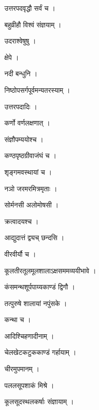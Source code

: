 \documentclass[10pt, openany, oneside]{book}
\begin{document}
\noindent उत्तरपदवृद्धौ सर्वं च ।

\noindent बहुव्रीहौ विश्वं संज्ञयाम् ।

\noindent उदराश्वेषुषु ।

\noindent क्षेपे ।

\noindent नदी बन्धुनि ।

\noindent निष्ठोपसर्गपूर्वमन्यतरस्याम् ।

\noindent उत्तरपदादिः ।

\noindent कर्णो वर्णलक्षणात् ।

\noindent संज्ञौपम्ययोश्च ।

\noindent कण्ठपृष्ठग्रीवाजंघं च ।

\noindent श‍ृङ्गमवस्थायां च ।

\noindent नञो जरमरमित्रमृताः ।

\noindent सोर्मनसी अलोमोषसी ।

\noindent क्रत्वादयश्च ।

\noindent आद्युदात्तं द्व्यच् छन्दसि ।

\noindent वीरवीर्यौ च ।

\noindent कूलतीरतूलमूलशालाऽक्षसममव्ययीभावे ।

\noindent कंसमन्थशूर्पपाय्यकाण्डं द्विगौ ।

\noindent तत्पुरुषे शालायां नपुंसके ।

\noindent कन्था च ।

\noindent आदिश्चिहणादीनाम् ।

\noindent चेलखेटकटुककाण्डं गर्हायाम् ।

\noindent चीरमुपमानम् ।

\noindent पललसूपशाकं मिश्रे ।

\noindent कूलसूदस्थलकर्षाः संज्ञायाम् ।
\end{document}

